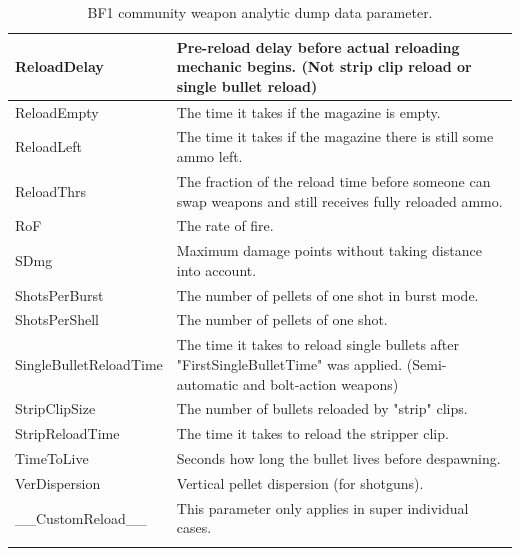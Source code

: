 \documentclass[MGS,Master,english]{twbook}%
\begin{document}
\begin{longtable}[c]{|l|p{10.5cm}|}
	ReloadDelay            & Pre-reload delay before actual reloading mechanic begins. (Not strip clip reload or single bullet reload)                      \\ \hline
	ReloadEmpty            & The time it takes if the magazine is empty.                                                                                    \\ \hline
	ReloadLeft             & The time it takes if the magazine there is still some ammo left.                                                               \\ \hline
	ReloadThrs             & The fraction of the reload time before someone can swap weapons and still receives fully reloaded ammo.                        \\ \hline
	RoF                    & The rate of fire.                                                                                                              \\ \hline
	SDmg                   & Maximum damage points without taking distance into account.                                                                    \\ \hline
	ShotsPerBurst          & The number of pellets of one shot in burst mode.                                                                               \\ \hline
	ShotsPerShell          & The number of pellets of one shot.                                                                                             \\ \hline
	SingleBulletReloadTime & The time it takes to reload single bullets after "FirstSingleBulletTime" was applied. (Semi-automatic and bolt-action weapons) \\ \hline
	StripClipSize          & The number of bullets reloaded by "strip" clips.                                                                               \\ \hline
	StripReloadTime        & The time it takes to reload the stripper clip.                                                                                 \\ \hline
	TimeToLive             & Seconds how long the bullet lives before despawning.                                                                           \\ \hline
	VerDispersion          & Vertical pellet dispersion (for shotguns).                                                                                     \\ \hline
	\_\_CustomReload\_\_   & This parameter only applies in super individual cases.                                                                         \\ \hline
	\caption{\ac{BF1} community weapon analytic dump data parameter.}
\end{longtable}
\end{document}
